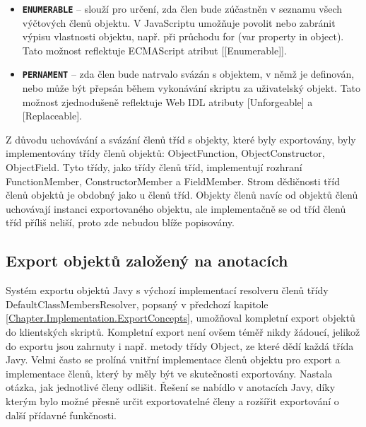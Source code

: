 \begin{itemize}
  \item \textbf{\texttt{ENUMERABLE}} -- slouží pro určení, zda člen bude zúčastněn v seznamu všech výčtových členů objektu. V JavaScriptu umožňuje povolit nebo zabránit výpisu vlastnosti objektu, např. při průchodu for (var property in object). Tato možnost reflektuje ECMAScript atribut [[Enumerable]].
  \item \textbf{\texttt{PERNAMENT}} -- zda člen bude natrvalo svázán s objektem, v němž je definován, nebo může být přepsán během vykonávání skriptu za uživatelský objekt. Tato možnost zjednodušeně reflektuje Web IDL atributy [Unforgeable] a [Replaceable].
\end{itemize}

Z důvodu uchovávání a svázání členů tříd s objekty, které byly exportovány, byly implementovány třídy členů objektů: ObjectFunction, ObjectConstructor, ObjectField. Tyto třídy, jako třídy členů tříd, implementují rozhraní FunctionMember, ConstructorMember a FieldMember. Strom dědičnosti tříd členů objektů je obdobný jako u členů tříd. Objekty členů navíc od objektů členů uchovávají instanci exportovaného objektu, ale implementačně se od tříd členů tříd příliš neliší, proto zde nebudou blíže popisovány.

\subsection{Export objektů založený na anotacích}
\label{Chapter.Implementation.AnnotationExportConcepts}

Systém exportu objektů Javy s výchozí implementací resolveru členů třídy DefaultClassMembersResolver, popsaný v předchozí kapitole \ref{Chapter.Implementation.ExportConcepts}, umožňoval kompletní export objektů do klientských skriptů. Kompletní export není ovšem téměř nikdy žádoucí, jelikož do exportu jsou zahrnuty i např. metody třídy Object, ze které dědí každá třída Javy. Velmi často se prolíná vnitřní implementace členů objektu pro export a implementace členů, který by měly být ve skutečnosti exportovány. Nastala otázka, jak jednotlivé členy odlišit. Řešení se nabídlo v anotacích Javy, díky kterým bylo možné přesně určit exportovatelné členy a rozšířit exportování o další přídavné funkčnosti.

